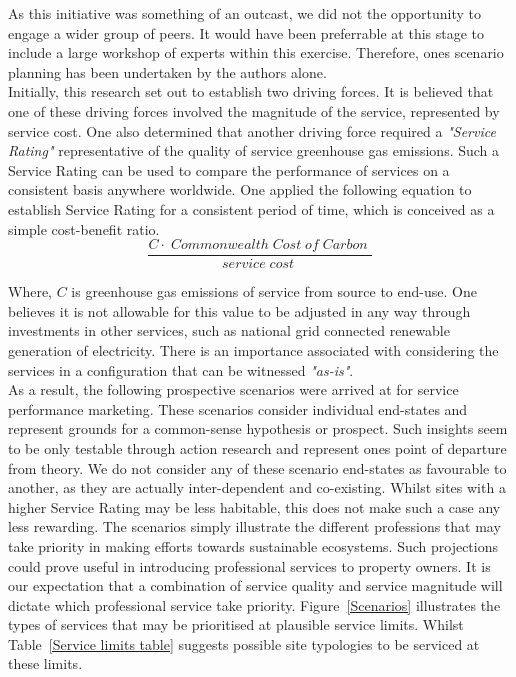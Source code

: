 \documentclass[11pt, oneside]{article}   	%
\begin{document}
As this initiative was something of an outcast, we did not the opportunity to engage a wider group of peers.
It would have been preferrable at this stage to include a large workshop of experts within this exercise.
Therefore, ones scenario planning has been undertaken by the authors alone.\\

Initially, this research set out to establish two driving forces.
It is believed that one of these driving forces involved the magnitude of the service, represented by service cost.
One also determined that another driving force required a \emph{"Service Rating"} representative of the quality of service greenhouse gas emissions.
Such a Service Rating can be used to compare the performance of services on a consistent basis anywhere worldwide.
One applied the following equation to establish Service Rating for a consistent period of time, which is conceived as a simple cost-benefit ratio.\\

\begin{equation}
	\frac{C  \cdot \;Commonwealth\; Cost\; of\; Carbon\;}{service\; cost\;}
\end{equation}

Where, $C$ is greenhouse gas emissions of service from source to end-use.
One believes it is not allowable for this value to be adjusted in any way through investments in other services, such as national grid connected renewable generation of electricity.
There is an importance associated with considering the services in a configuration that can be witnessed \emph{"as-is"}.\\

As a result, the following prospective scenarios were arrived at for service performance marketing.
These scenarios consider individual end-states and represent grounds for a common-sense hypothesis or prospect.
Such insights seem to be only testable through action research and represent ones point of departure from theory.
We do not consider any of these scenario end-states as favourable to another, as they are actually inter-dependent and co-existing.
Whilst sites with a higher Service Rating may be less habitable, this does not make such a case any less rewarding.
The scenarios simply illustrate the different professions that may take priority in making efforts towards sustainable ecosystems.
Such projections could prove useful in introducing professional services to property owners.
It is our expectation that a combination of service quality and service magnitude will dictate which professional service take priority.
Figure~\ref{Scenarios} illustrates the types of services that may be prioritised at plausible service limits.
Whilst Table~\ref{Service limits table} suggests possible site typologies to be serviced at these limits.\\
\end{document}
